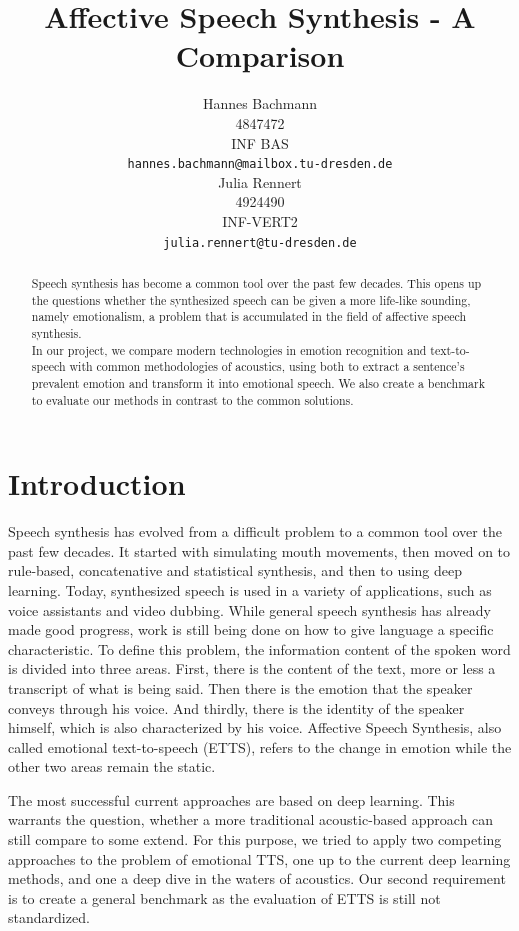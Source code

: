 \documentclass[11pt]{article}
\title{Affective Speech Synthesis - A Comparison}
\author{Hannes Bachmann\\
  4847472\\
  INF BAS \\
  \texttt{\small hannes.bachmann@mailbox.tu-dresden.de}
  \\ \And
  Julia Rennert \\
  4924490\\
  INF-VERT2 \\
  \texttt{\small julia.rennert@tu-dresden.de}
  }
\begin{document}
\maketitle
\begin{abstract}
Speech synthesis has become a common tool over the past few decades. This opens up the questions whether the synthesized speech can be given a more life-like sounding, namely emotionalism, a problem that is accumulated in the field of affective speech synthesis. \\
In our project, we compare modern technologies in emotion recognition and text-to-speech with common methodologies of acoustics, using both to extract a sentence's prevalent emotion and transform it into emotional speech. We also create a benchmark to evaluate our methods in contrast to the common solutions.
\end{abstract}

\section{Introduction}
Speech synthesis has evolved from a difficult problem to a common tool over the past few decades.
It started with simulating mouth movements, then moved on to rule-based, concatenative and
statistical synthesis, and then to using deep learning. Today, synthesized speech is used in a
variety of applications, such as voice assistants and video dubbing.
While general speech synthesis has already made good progress, work is still being done on
how to give language a specific characteristic. To define this problem, the information content of
the spoken word is divided into three areas. First, there is the content of the text, more or less
a transcript of what is being said. Then there is the emotion that the speaker conveys through
his voice. And thirdly, there is the identity of the speaker himself, which is also characterized by
his voice. Affective Speech Synthesis, also called emotional text-to-speech (ETTS), refers to the change in emotion while the other two areas remain the static.

The most successful current approaches are based on deep learning\cite{triantafyllopoulos_overview_2023, cho_multi-speaker_2021, diatlova_emospeech_2023}. This warrants the question, whether a more traditional acoustic-based approach can still compare to some extend. For this purpose, we tried to apply two competing approaches to the problem of emotional TTS, one up to the current deep learning methods, and one a deep dive in the waters of acoustics. Our second requirement is to create a general benchmark as the evaluation of ETTS is still not standardized.
\end{document}
